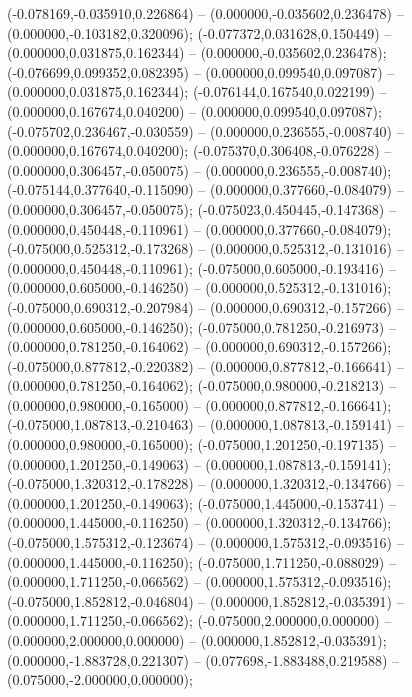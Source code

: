  (-0.078169,-0.035910,0.226864) -- (0.000000,-0.035602,0.236478) -- (0.000000,-0.103182,0.320096);
 (-0.077372,0.031628,0.150449) -- (0.000000,0.031875,0.162344) -- (0.000000,-0.035602,0.236478);
 (-0.076699,0.099352,0.082395) -- (0.000000,0.099540,0.097087) -- (0.000000,0.031875,0.162344);
 (-0.076144,0.167540,0.022199) -- (0.000000,0.167674,0.040200) -- (0.000000,0.099540,0.097087);
 (-0.075702,0.236467,-0.030559) -- (0.000000,0.236555,-0.008740) -- (0.000000,0.167674,0.040200);
 (-0.075370,0.306408,-0.076228) -- (0.000000,0.306457,-0.050075) -- (0.000000,0.236555,-0.008740);
 (-0.075144,0.377640,-0.115090) -- (0.000000,0.377660,-0.084079) -- (0.000000,0.306457,-0.050075);
 (-0.075023,0.450445,-0.147368) -- (0.000000,0.450448,-0.110961) -- (0.000000,0.377660,-0.084079);
 (-0.075000,0.525312,-0.173268) -- (0.000000,0.525312,-0.131016) -- (0.000000,0.450448,-0.110961);
 (-0.075000,0.605000,-0.193416) -- (0.000000,0.605000,-0.146250) -- (0.000000,0.525312,-0.131016);
 (-0.075000,0.690312,-0.207984) -- (0.000000,0.690312,-0.157266) -- (0.000000,0.605000,-0.146250);
 (-0.075000,0.781250,-0.216973) -- (0.000000,0.781250,-0.164062) -- (0.000000,0.690312,-0.157266);
 (-0.075000,0.877812,-0.220382) -- (0.000000,0.877812,-0.166641) -- (0.000000,0.781250,-0.164062);
 (-0.075000,0.980000,-0.218213) -- (0.000000,0.980000,-0.165000) -- (0.000000,0.877812,-0.166641);
 (-0.075000,1.087813,-0.210463) -- (0.000000,1.087813,-0.159141) -- (0.000000,0.980000,-0.165000);
 (-0.075000,1.201250,-0.197135) -- (0.000000,1.201250,-0.149063) -- (0.000000,1.087813,-0.159141);
 (-0.075000,1.320312,-0.178228) -- (0.000000,1.320312,-0.134766) -- (0.000000,1.201250,-0.149063);
 (-0.075000,1.445000,-0.153741) -- (0.000000,1.445000,-0.116250) -- (0.000000,1.320312,-0.134766);
 (-0.075000,1.575312,-0.123674) -- (0.000000,1.575312,-0.093516) -- (0.000000,1.445000,-0.116250);
 (-0.075000,1.711250,-0.088029) -- (0.000000,1.711250,-0.066562) -- (0.000000,1.575312,-0.093516);
 (-0.075000,1.852812,-0.046804) -- (0.000000,1.852812,-0.035391) -- (0.000000,1.711250,-0.066562);
 (-0.075000,2.000000,0.000000) -- (0.000000,2.000000,0.000000) -- (0.000000,1.852812,-0.035391);
 (0.000000,-1.883728,0.221307) -- (0.077698,-1.883488,0.219588) -- (0.075000,-2.000000,0.000000);
